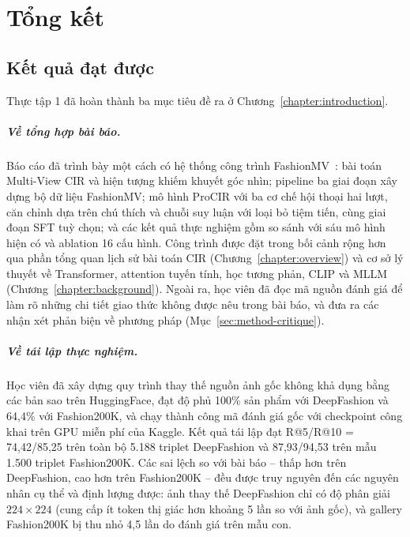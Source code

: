 \chapter{Tổng kết}\label{chapter:conclusion}
\pagestyle{fancy}

\section{Kết quả đạt được}

Thực tập 1 đã hoàn thành ba mục tiêu đề ra ở Chương~\ref{chapter:introduction}.

\paragraph{Về tổng hợp bài báo.} Báo cáo đã trình bày một cách có hệ thống công trình FashionMV~\cite{yuan2026fashionmv}: bài toán Multi-View CIR và hiện tượng khiếm khuyết góc nhìn; pipeline ba giai đoạn xây dựng bộ dữ liệu FashionMV; mô hình ProCIR với ba cơ chế hội thoại hai lượt, căn chỉnh dựa trên chú thích và chuỗi suy luận với loại bỏ tiệm tiến, cùng giai đoạn SFT tuỳ chọn; và các kết quả thực nghiệm gồm so sánh với sáu mô hình hiện có và ablation 16 cấu hình. Công trình được đặt trong bối cảnh rộng hơn qua phần tổng quan lịch sử bài toán CIR (Chương~\ref{chapter:overview}) và cơ sở lý thuyết về Transformer, attention tuyến tính, học tương phản, CLIP và MLLM (Chương~\ref{chapter:background}). Ngoài ra, học viên đã đọc mã nguồn đánh giá để làm rõ những chi tiết giao thức không được nêu trong bài báo, và đưa ra các nhận xét phản biện về phương pháp (Mục~\ref{sec:method-critique}).

\paragraph{Về tái lập thực nghiệm.} Học viên đã xây dựng quy trình thay thế nguồn ảnh gốc không khả dụng bằng các bản sao trên HuggingFace, đạt độ phủ 100\% sản phẩm với DeepFashion và 64,4\% với Fashion200K, và chạy thành công mã đánh giá gốc với checkpoint công khai trên GPU miễn phí của Kaggle. Kết quả tái lập đạt R@5/R@10 = 74,42/85,25 trên toàn bộ 5.188 triplet DeepFashion và 87,93/94,53 trên mẫu 1.500 triplet Fashion200K. Các sai lệch so với bài báo -- thấp hơn trên DeepFashion, cao hơn trên Fashion200K -- đều được truy nguyên đến các nguyên nhân cụ thể và định lượng được: ảnh thay thế DeepFashion chỉ có độ phân giải $224 \times 224$ (cung cấp ít token thị giác hơn khoảng 5 lần so với ảnh gốc), và gallery Fashion200K bị thu nhỏ 4,5 lần do đánh giá trên mẫu con.

